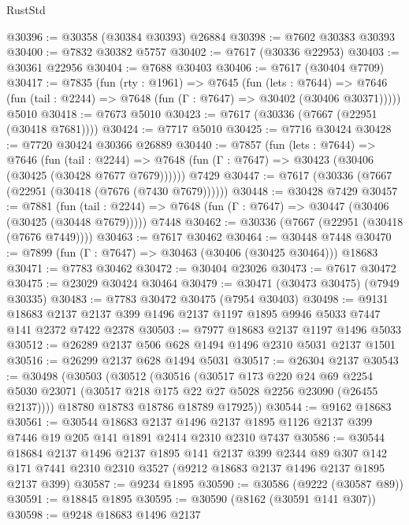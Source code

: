\begin{lexlean}{RustStd}
\begin{coremodule}
@30396 := @30358 (@30384 @30393) @26884
@30398 := @7602 @30383 @30393
@30400 := @7832 @30382 @5757
@30402 := @7617 (@30336 @22953)
@30403 := @30361 @22956
@30404 := @7688 @30403
@30406 := @7617 (@30404 @7709)
@30417 := @7835
    (fun (rty : @1961) =>
    @7645
      (fun (lets : @7644) =>
      @7646 (fun (tail : @2244) => @7648 (fun (Γ : @7647) => @30402 (@30406 @30371)))))
    @5010
@30418 := @7673 @5010
@30423 := @7617 (@30336 (@7667 (@22951 (@30418 @7681))))
@30424 := @7717 @5010
@30425 := @7716 @30424
@30428 := @7720 @30424 @30366 @26889
@30440 := @7857
    (fun (lets : @7644) =>
    @7646
      (fun (tail : @2244) =>
      @7648 (fun (Γ : @7647) => @30423 (@30406 (@30425 (@30428 @7677 @7679))))))
    @7429
@30447 := @7617 (@30336 (@7667 (@22951 (@30418 (@7676 (@7430 @7679))))))
@30448 := @30428 @7429
@30457 := @7881
    (fun (tail : @2244) => @7648 (fun (Γ : @7647) => @30447 (@30406 (@30425 (@30448 @7679)))))
    @7448
@30462 := @30336 (@7667 (@22951 (@30418 (@7676 @7449))))
@30463 := @7617 @30462
@30464 := @30448 @7448
@30470 := @7899 (fun (Γ : @7647) => @30463 (@30406 (@30425 @30464))) @18683
@30471 := @7783 @30462
@30472 := @30404 @23026
@30473 := @7617 @30472
@30475 := @23029 @30424 @30464
@30479 := @30471 (@30473 @30475) (@7949 @30335)
@30483 := @7783 @30472 @30475 (@7954 @30403)
@30498 := @9131
    @18683
    @2137
    @2137
    @399
    @1496
    @2137
    @1197
    @1895
    @9946
    @5033
    @7447
    @141
    @2372
    @7422
    @2378
@30503 := @7977 @18683 @2137 @1197 @1496 @5033
@30512 := @26289 @2137 @506 @628 @1494 @1496 @2310 @5031 @2137 @1501
@30516 := @26299 @2137 @628 @1494 @5031
@30517 := @26304 @2137
@30543 := @30498
    (@30503
      (@30512
        (@30516
          (@30517
            @173
            @220
            @24
            @69
            @2254
            @5030
            @23071
            (@30517 @218 @175 @22 @27 @5028 @2256 @23090 (@26455 @2137))))
        @18780
        @18783
        @18786
        @18789
        @17925))
@30544 := @9162 @18683
@30561 := @30544
    @18683
    @2137
    @1496
    @2137
    @1895
    @1126
    @2137
    @399
    @7446
    @19
    @205
    @141
    @1891
    @2414
    @2310
    @2310
    @7437
@30586 := @30544
    @18684
    @2137
    @1496
    @2137
    @1895
    @141
    @2137
    @399
    @2344
    @89
    @307
    @142
    @171
    @7441
    @2310
    @2310
    @3527
    (@9212 @18683 @2137 @1496 @2137 @1895 @2137 @399)
@30587 := @9234 @1895
@30590 := @30586 (@9222 (@30587 @89))
@30591 := @18845 @1895
@30595 := @30590 (@8162 (@30591 @141 @307))
@30598 := @9248 @18683 @1496 @2137

\end{coremodule}
\end{lexlean}
